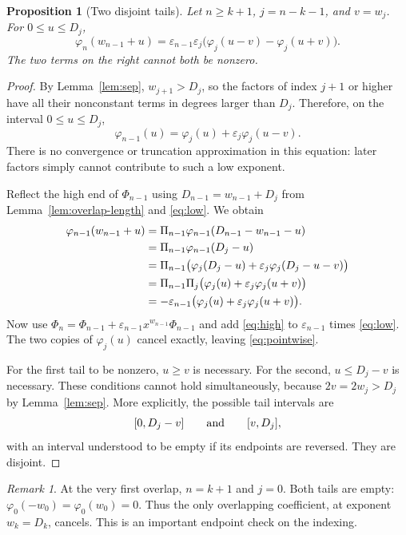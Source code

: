 \documentclass[11pt,letterpaper]{article}
\numberwithin{equation}{section}
\newtheorem{proposition}[theorem]{Proposition}
\theoremstyle{definition}
\theoremstyle{remark}
\newtheorem{remark}[theorem]{Remark}
\newcommand{\eps}{\varepsilon}
\begin{document}
\begin{proposition}[Two disjoint tails]
\label{prop:pointwise}
Let $n\ge k+1$, $j=n-k-1$, and $v=w_j$. For $0\le u\le D_j$,
\begin{equation}
\boxed{\displaystyle
 \varphi_n(w_{n-1}+u)=\eps_{n-1}\eps_j
       \bigl(\varphi_j(u-v)-\varphi_j(u+v)\bigr).}
 \label{eq:pointwise}
\end{equation}
The two terms on the right cannot both be nonzero.
\end{proposition}
\begin{proof}
By Lemma~\ref{lem:sep}, $w_{j+1}>D_j$, so the factors of index $j+1$ or
higher have all their nonconstant terms in degrees larger than $D_j$.
Therefore, on the interval $0\le u\le D_j$,
\begin{equation}
 \varphi_{n-1}(u)=\varphi_j(u)+\eps_j\varphi_j(u-v).
 \label{eq:low}
\end{equation}
There is no convergence or truncation approximation in this equation:
later factors simply cannot contribute to such a low exponent.

Reflect the high end of $\Phi_{n-1}$ using
$D_{n-1}=w_{n-1}+D_j$ from Lemma~\ref{lem:overlap-length} and
\eqref{eq:low}. We obtain
\begin{align}
 \varphi_{n-1}(w_{n-1}+u)
 &=\Pi_{n-1}\varphi_{n-1}(D_{n-1}-w_{n-1}-u)\notag\\
 &=\Pi_{n-1}\varphi_{n-1}(D_j-u)\notag\\
 &=\Pi_{n-1}\bigl(\varphi_j(D_j-u)+\eps_j\varphi_j(D_j-u-v)\bigr)\notag\\
 &=\Pi_{n-1}\Pi_j\bigl(\varphi_j(u)+\eps_j\varphi_j(u+v)\bigr)\notag\\
 &=-\eps_{n-1}\bigl(\varphi_j(u)+\eps_j\varphi_j(u+v)\bigr).
 \label{eq:high}
\end{align}
Now use $\Phi_n=\Phi_{n-1}+\eps_{n-1}x^{w_{n-1}}\Phi_{n-1}$ and add
\eqref{eq:high} to $\eps_{n-1}$ times \eqref{eq:low}. The two copies of
$\varphi_j(u)$ cancel exactly, leaving \eqref{eq:pointwise}.

For the first tail to be nonzero, $u\ge v$ is necessary. For the second,
$u\le D_j-v$ is necessary. These conditions cannot hold simultaneously,
because $2v=2w_j>D_j$ by Lemma~\ref{lem:sep}. More explicitly, the possible
tail intervals are
\[
 [0,D_j-v]\qquad\hbox{and}\qquad[v,D_j],
\]
with an interval understood to be empty if its endpoints are reversed.
They are disjoint.
\end{proof}

\begin{remark}
At the very first overlap, $n=k+1$ and $j=0$. Both tails are empty:
$\varphi_0(-w_0)=\varphi_0(w_0)=0$. Thus the only overlapping coefficient,
at exponent $w_k=D_k$, cancels. This is an important endpoint check on the
indexing.
\end{remark}
\end{document}
